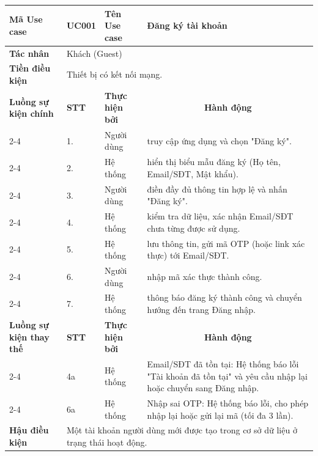 \documentclass[../main.tex]{subfiles}
\begin{document}
\begin{longtable}{|p{2.7cm}|p{0.8cm}|p{2.6cm}|p{7.3cm}|}
\hline
\cellcolor[HTML]{D5F5E3}\textbf{Mã Use case} & \multicolumn{1}{l|}{UC001} & \cellcolor[HTML]{D5F5E3}\textbf{Tên Use case} & Đăng ký tài khoản \\ \hline
\cellcolor[HTML]{D5F5E3}\textbf{Tác nhân} & \multicolumn{3}{p{10.7cm}|}{Khách (Guest)} \\ \hline
\cellcolor[HTML]{D5F5E3}\textbf{Tiền điều kiện} & \multicolumn{3}{p{10.7cm}|}{Thiết bị có kết nối mạng.} \\ \hline

\cellcolor[HTML]{D5F5E3}\textbf{Luồng sự kiện chính} & \cellcolor[HTML]{FDEBD0}\textbf{STT} & \cellcolor[HTML]{FDEBD0}\textbf{Thực hiện bởi} & \multicolumn{1}{c|}{\cellcolor[HTML]{FDEBD0}\textbf{Hành động}} \\ \cline{2-4} 
\cellcolor[HTML]{D5F5E3} & 1. & Người dùng & truy cập ứng dụng và chọn "Đăng ký". \\ \cline{2-4} 
\cellcolor[HTML]{D5F5E3} & 2. & Hệ thống & hiển thị biểu mẫu đăng ký (Họ tên, Email/SĐT, Mật khẩu). \\ \cline{2-4} 
\cellcolor[HTML]{D5F5E3} & 3. & Người dùng & điền đầy đủ thông tin hợp lệ và nhấn "Đăng ký". \\ \cline{2-4} 
\cellcolor[HTML]{D5F5E3} & 4. & Hệ thống & kiểm tra dữ liệu, xác nhận Email/SĐT chưa từng được sử dụng. \\ \cline{2-4} 
\cellcolor[HTML]{D5F5E3} & 5. & Hệ thống & lưu thông tin, gửi mã OTP (hoặc link xác thực) tới Email/SĐT. \\ \cline{2-4} 
\cellcolor[HTML]{D5F5E3} & 6. & Người dùng & nhập mã xác thực thành công. \\ \cline{2-4} 
\cellcolor[HTML]{D5F5E3} & 7. & Hệ thống & thông báo đăng ký thành công và chuyển hướng đến trang Đăng nhập. \\ \hline

\cellcolor[HTML]{D5F5E3}\textbf{Luồng sự kiện thay thế} & \cellcolor[HTML]{FDEBD0}\textbf{STT} & \cellcolor[HTML]{FDEBD0}\textbf{Thực hiện bởi} & \multicolumn{1}{c|}{\cellcolor[HTML]{FDEBD0}\textbf{Hành động}} \\ \cline{2-4} 
\cellcolor[HTML]{D5F5E3} & 4a & Hệ thống & Email/SĐT đã tồn tại: Hệ thống báo lỗi "Tài khoản đã tồn tại" và yêu cầu nhập lại hoặc chuyển sang Đăng nhập. \\ \cline{2-4} 
\cellcolor[HTML]{D5F5E3} & 6a & Hệ thống & Nhập sai OTP: Hệ thống báo lỗi, cho phép nhập lại hoặc gửi lại mã (tối đa 3 lần). \\ \hline

\cellcolor[HTML]{D5F5E3}\textbf{Hậu điều kiện} & \multicolumn{3}{p{10.7cm}|}{Một tài khoản người dùng mới được tạo trong cơ sở dữ liệu ở trạng thái hoạt động.} \\ \hline
\end{longtable}
\endgroup
\end{document}
